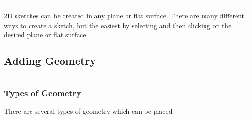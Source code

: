 {\color{green} \rule{\linewidth}{0.5mm}}

2D sketches can be created in any plane or flat surface. There are many different ways to create a sketch, but the easiest by selecting  and then clicking on the desired plane or flat surface.

\subsection{Adding Geometry}

$ $

\subsubsection{Types of Geometry}

There are several types of geometry which can be placed:


